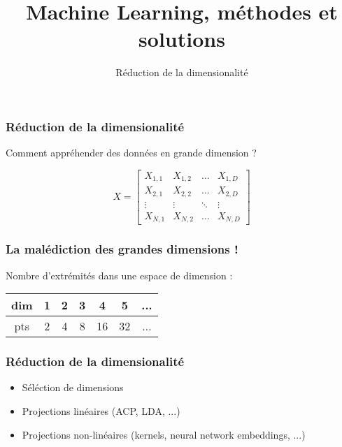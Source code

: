 \documentclass{formation}
\title{Machine Learning, méthodes et solutions}
\subtitle{Réduction de la dimensionalité}
\begin{document}
\maketitle

\begin{frame}
  \frametitle{Réduction de la dimensionalité}
    \begin{center}
      Comment appréhender des données en grande dimension ?
    \end{center}
    \[
    X = \begin{bmatrix}
      X_{1,1} & X_{1,2} & \dots  & X_{1,D} \\
      X_{2,1} & X_{2,2} & \dots  & X_{2,D} \\
      \vdots & \vdots & \ddots & \vdots \\
      X_{N,1} & X_{N,2} & \dots  & X_{N,D}
    \end{bmatrix}
    \]
\end{frame}

\begin{frame}
  \frametitle{La malédiction des grandes dimensions !}
    \begin{center}
      Nombre d'extrémités dans une espace de dimension : \\
      $\;$ \\
      \begin{tabular}{|c|c|c|c|c|c|c|}
        \hline
        dim & 1 & 2 & 3 & 4 & 5 & ... \\
        \hline
        pts & 2 & 4 & 8 & 16 & 32 & ...\\
        \hline
      \end{tabular}
    \end{center}
\end{frame}

\begin{frame}
  \frametitle{Réduction de la dimensionalité}
    \begin{itemize}
    \item Séléction de dimensions
    \item Projections linéaires (ACP, LDA, ...)
    \item Projections non-linéaires (kernels, neural network embeddings, ...)
    \end{itemize}
\end{frame}
\end{document}
